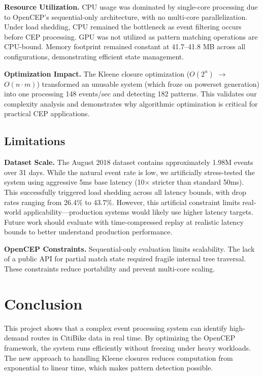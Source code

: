 \documentclass[sigconf]{acmart}
\begin{document}
\textbf{Resource Utilization.} CPU usage was dominated by single-core processing due to OpenCEP's sequential-only architecture, with no multi-core parallelization. Under load shedding, CPU remained the bottleneck as event filtering occurs before CEP processing. GPU was not utilized as pattern matching operations are CPU-bound. Memory footprint remained constant at 41.7--41.8 MB across all configurations, demonstrating efficient state management.

\textbf{Optimization Impact.} The Kleene closure optimization ($O(2^n)$ $\rightarrow$ $O(n \cdot m)$) transformed an unusable system (which froze on powerset generation) into one processing 148 events/sec and detecting 182 patterns. This validates our complexity analysis and demonstrates why algorithmic optimization is critical for practical CEP applications.

\subsection{Limitations}

\textbf{Dataset Scale.} The August 2018 dataset contains approximately 1.98M events over 31 days. While the natural event rate is low, we artificially stress-tested the system using aggressive 5ms base latency (10× stricter than standard 50ms). This successfully triggered load shedding across all latency bounds, with drop rates ranging from 26.4\% to 43.7\%. However, this artificial constraint limits real-world applicability—production systems would likely use higher latency targets. Future work should evaluate with time-compressed replay at realistic latency bounds to better understand production performance.

\textbf{OpenCEP Constraints.} Sequential-only evaluation limits scalability. The lack of a public API for partial match state required fragile internal tree traversal. These constraints reduce portability and prevent multi-core scaling.

\section{Conclusion}

This project shows that a complex event processing system can identify high-demand routes in CitiBike data in real time. By optimizing the OpenCEP framework, the system runs efficiently without freezing under heavy workloads. The new approach to handling Kleene closures reduces computation from exponential to linear time, which makes pattern detection possible.
\end{document}
